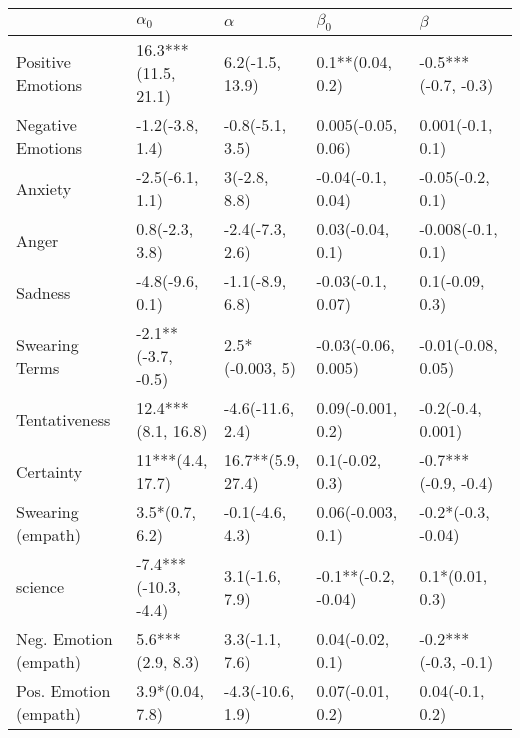 \begin{tabular}{lllll}
\toprule
{} &            $\alpha_0$ &           $\alpha$ &            $\beta_0$ &              $\beta$ \\
\midrule
Positive Emotions     &   16.3***(11.5, 21.1) &    6.2(-1.5, 13.9) &     0.1**(0.04, 0.2) &  -0.5***(-0.7, -0.3) \\
Negative Emotions     &       -1.2(-3.8, 1.4) &    -0.8(-5.1, 3.5) &   0.005(-0.05, 0.06) &     0.001(-0.1, 0.1) \\
Anxiety               &       -2.5(-6.1, 1.1) &       3(-2.8, 8.8) &    -0.04(-0.1, 0.04) &     -0.05(-0.2, 0.1) \\
Anger                 &        0.8(-2.3, 3.8) &    -2.4(-7.3, 2.6) &     0.03(-0.04, 0.1) &    -0.008(-0.1, 0.1) \\
Sadness               &       -4.8(-9.6, 0.1) &    -1.1(-8.9, 6.8) &    -0.03(-0.1, 0.07) &      0.1(-0.09, 0.3) \\
Swearing Terms        &    -2.1**(-3.7, -0.5) &    2.5*(-0.003, 5) &  -0.03(-0.06, 0.005) &   -0.01(-0.08, 0.05) \\
Tentativeness         &    12.4***(8.1, 16.8) &   -4.6(-11.6, 2.4) &    0.09(-0.001, 0.2) &    -0.2(-0.4, 0.001) \\
Certainty             &      11***(4.4, 17.7) &  16.7**(5.9, 27.4) &      0.1(-0.02, 0.3) &  -0.7***(-0.9, -0.4) \\
Swearing (empath)     &        3.5*(0.7, 6.2) &    -0.1(-4.6, 4.3) &    0.06(-0.003, 0.1) &   -0.2*(-0.3, -0.04) \\
science               &  -7.4***(-10.3, -4.4) &     3.1(-1.6, 7.9) &  -0.1**(-0.2, -0.04) &      0.1*(0.01, 0.3) \\
Neg. Emotion (empath) &      5.6***(2.9, 8.3) &     3.3(-1.1, 7.6) &     0.04(-0.02, 0.1) &  -0.2***(-0.3, -0.1) \\
Pos. Emotion (empath) &       3.9*(0.04, 7.8) &   -4.3(-10.6, 1.9) &     0.07(-0.01, 0.2) &      0.04(-0.1, 0.2) \\
\bottomrule
\end{tabular}
